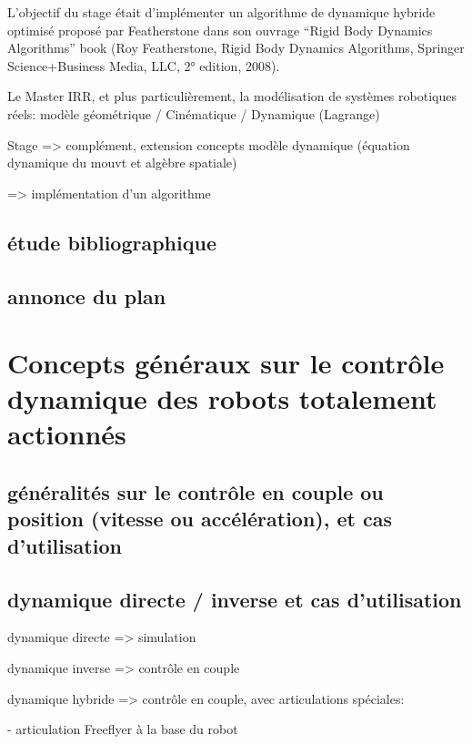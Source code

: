 \documentclass{report}
\begin{document}
L'objectif du stage était d'implémenter un algorithme de dynamique hybride optimisé proposé par Featherstone dans son ouvrage “Rigid Body Dynamics Algorithms” book (Roy Featherstone, Rigid Body Dynamics Algorithms, Springer Science+Business Media, LLC, 2° edition, 2008).

Le Master IRR, et plus particulièrement, la modélisation de systèmes robotiques réels:
modèle géométrique / Cinématique / Dynamique (Lagrange)

Stage => complément, extension concepts modèle dynamique (équation dynamique du mouvt et algèbre spatiale)



=> implémentation d'un algorithme

\section*{étude bibliographique}


\section*{annonce du plan}


\chapter{Concepts généraux sur le contrôle dynamique des robots totalement actionnés}

\section{généralités sur le contrôle en couple ou position (vitesse ou accélération), et cas d'utilisation}

\section{dynamique directe / inverse et cas d'utilisation}

dynamique directe => simulation
\vspace{0.3cm}

dynamique inverse => contrôle en couple
\vspace{0.3cm}

dynamique hybride => contrôle en couple, avec articulations spéciales:
\vspace{0.3cm}

	- articulation Freeflyer à la base du robot
\end{document}
